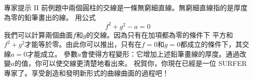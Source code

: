 \begin{surferPage}{專家提示 II}
前例題中兩個圓柱的交線是一條無窮細直線。無窮細直線指的是厚度為零的鉛筆畫出的線。
用公式
\[ f^2+g^2-a=0\]
我們可以計算兩個曲面$f$和$g$的交線。因為只有在加項都為零的條件下
平方和$f^2+g^2$才能等於零。由此你可以推出，只有在$f=0$和$g=0$都成立的條件下，其交線$a=0$才能成立。
參數$a$會使得方程變形：它增加上述鉛筆畫線的厚度。通過改變$a$的值，你可以使交線更清楚地看出來。
\newline \newline
祝賀你，你現在已經是一位 SURFER 專家了。享受創造和發明新形式的曲線曲面的過程吧！
\end{surferPage}
